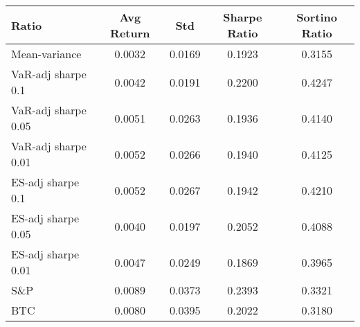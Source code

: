 \begin{tabular}{lcccc}
\toprule
Ratio & Avg Return & Std & Sharpe Ratio & Sortino Ratio\\
\midrule
Mean-variance & 0.0032 & 0.0169 & 0.1923 & 0.3155\\
VaR-adj sharpe 0.1 & 0.0042 & 0.0191 & 0.2200 & 0.4247\\
VaR-adj sharpe 0.05 & 0.0051 & 0.0263 & 0.1936 & 0.4140\\
VaR-adj sharpe 0.01 & 0.0052 & 0.0266 & 0.1940 & 0.4125\\
ES-adj sharpe 0.1 & 0.0052 & 0.0267 & 0.1942 & 0.4210\\
ES-adj sharpe 0.05 & 0.0040 & 0.0197 & 0.2052 & 0.4088\\
ES-adj sharpe 0.01 & 0.0047 & 0.0249 & 0.1869 & 0.3965\\
S\&P & 0.0089 & 0.0373 & 0.2393 & 0.3321\\
BTC & 0.0080 & 0.0395 & 0.2022 & 0.3180\\
\bottomrule
\end{tabular}

